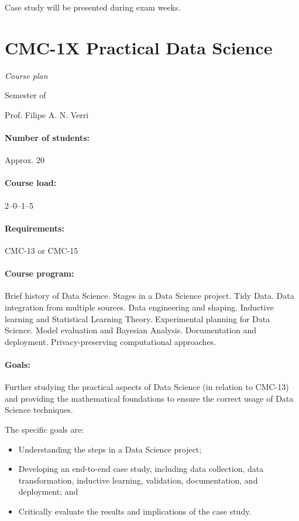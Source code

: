 Case study will be presented during exam weeks.

\newpage
{}
\thispagestyle{empty}
\section*{CMC-1X Practical Data Science}

\emph{Course plan}

 Semester of \the\year{}

Prof. Filipe A. N. Verri

\paragraph{Number of students:} Approx. 20

\paragraph{Course load:} 2--0--1--5

\paragraph{Requirements:} CMC-13 or CMC-15

\paragraph{Course program:}
Brief history of Data Science. Stages in a Data Science project. Tidy Data. Data
integration from multiple sources. Data engineering and shaping. Inductive learning and
Statistical Learning Theory. Experimental planning for Data Science. Model evaluation and
Bayesian Analysis. Documentation and deployment. Privacy-preserving computational
approaches.

\paragraph{Goals:}
Further studying the practical aspects of Data Science (in relation to CMC-13) and providing
the mathematical foundations to ensure the correct usage of Data Science techniques.

The specific goals are:
\begin{itemize}
  \item Understanding the steps in a Data Science project;
  \item Developing an end-to-end case study, including data collection, data transformation,
    inductive learning, validation, documentation, and deployment; and
  \item Critically evaluate the results and implications of the case study.
\end{itemize}

